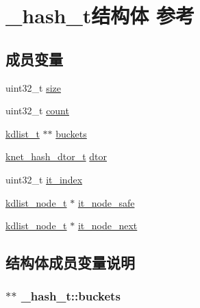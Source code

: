 \hypertarget{a00015}{}\section{\+\_\+hash\+\_\+t结构体 参考}
\label{a00015}
\subsection*{成员变量}
\begin{DoxyCompactItemize}
\item 
uint32\+\_\+t \hyperlink{a00015_a670ef62d04ed8614eb5c921e8610c0eb_a670ef62d04ed8614eb5c921e8610c0eb}{size}
\item 
uint32\+\_\+t \hyperlink{a00015_a49e8948b5242af0d06671e5a9e4bf299_a49e8948b5242af0d06671e5a9e4bf299}{count}
\item 
\hyperlink{a00054_ae098586334a621a23cef7cb17590b618_ae098586334a621a23cef7cb17590b618}{kdlist\+\_\+t} $\ast$$\ast$ \hyperlink{a00015_abb34478fc7197949ecfe1f840e059ef8_abb34478fc7197949ecfe1f840e059ef8}{buckets}
\item 
\hyperlink{a00054_af806592520383146be2f3aac316beb45_af806592520383146be2f3aac316beb45}{knet\+\_\+hash\+\_\+dtor\+\_\+t} \hyperlink{a00015_afb54b9a59d24504fe8c2ae78b269e889_afb54b9a59d24504fe8c2ae78b269e889}{dtor}
\item 
uint32\+\_\+t \hyperlink{a00015_a0508ecea0c72d04bae0c5238d14f1b64_a0508ecea0c72d04bae0c5238d14f1b64}{it\+\_\+index}
\item 
\hyperlink{a00054_ac701f00a0851c97467ae35c382b316b7_ac701f00a0851c97467ae35c382b316b7}{kdlist\+\_\+node\+\_\+t} $\ast$ \hyperlink{a00015_a0866f597371d3d6627568fada2df8e45_a0866f597371d3d6627568fada2df8e45}{it\+\_\+node\+\_\+safe}
\item 
\hyperlink{a00054_ac701f00a0851c97467ae35c382b316b7_ac701f00a0851c97467ae35c382b316b7}{kdlist\+\_\+node\+\_\+t} $\ast$ \hyperlink{a00015_a57a0237d618c050e83cb96d834d92dcd_a57a0237d618c050e83cb96d834d92dcd}{it\+\_\+node\+\_\+next}
\end{DoxyCompactItemize}


\subsection{结构体成员变量说明}
\hypertarget{a00015_abb34478fc7197949ecfe1f840e059ef8_abb34478fc7197949ecfe1f840e059ef8}{}
\subsubsection[{buckets}]{$\ast$$\ast$ \+\_\+hash\+\_\+t\+::buckets}\label{a00015_abb34478fc7197949ecfe1f840e059ef8_abb34478fc7197949ecfe1f840e059ef8}
\hypertarget{a00015_a49e8948b5242af0d06671e5a9e4bf299_a49e8948b5242af0d06671e5a9e4bf299}{}
